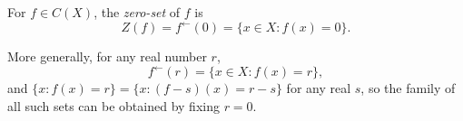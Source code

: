 For $f \in C(X)$, the \emph{zero-set} of $f$ is
$$Z(f) = f^{\leftarrow}(0) = \{x \in X : f(x) = 0\}.$$

More generally, for any real number $r$,
$$f^{\leftarrow}(r) = \{x \in X : f(x) = r\},$$
and $\{x : f(x) = r\} = \{x : (f - s)(x) = r - s\}$ for any real $s$, so the family of all such sets can be obtained by fixing $r = 0$.
